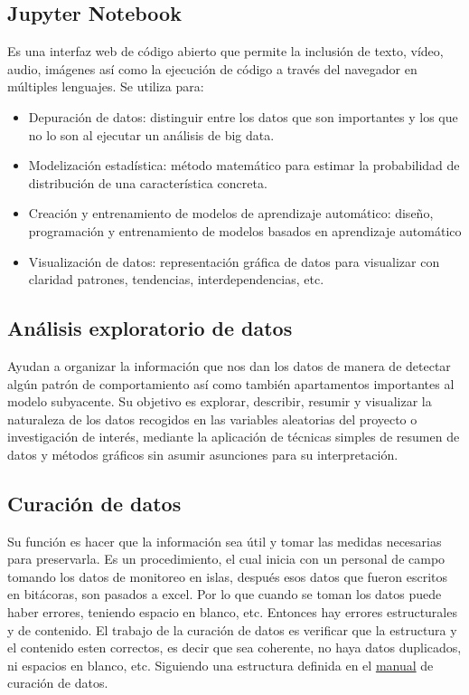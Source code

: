 \documentclass[12pt,letterpaper]{article}
\begin{document}
\subsection*{Jupyter Notebook}
Es una interfaz web de código abierto que permite la inclusión de texto, vídeo, audio, imágenes así
como la ejecución de código a través del navegador en múltiples lenguajes. 
\citep{cabrera_diaz_jupyter}
Se utiliza para: 
\begin{itemize}
\item Depuración de datos: distinguir entre los datos que son importantes y los que no lo son al
ejecutar un análisis de big data.
\item Modelización estadística: método matemático para estimar la probabilidad de distribución de
una característica concreta.
\item Creación y entrenamiento de modelos de aprendizaje automático: diseño, programación y
entrenamiento de modelos basados en aprendizaje automático
\item Visualización de datos: representación gráfica de datos para visualizar con claridad patrones,
tendencias, interdependencias, etc.
\citep{digital_guide_ionos_jupyter}
\end{itemize}

\subsection*{Análisis exploratorio de datos}
Ayudan a organizar la información que nos dan los datos de manera de detectar algún patrón de
comportamiento así como también apartamentos importantes al modelo subyacente.
\citep{orella_analisis_exploratorio}
Su objetivo es explorar, describir, resumir y visualizar la naturaleza de los datos recogidos en las
variables aleatorias del proyecto o investigación de interés, mediante la aplicación de técnicas
simples de resumen de datos y métodos gráficos sin asumir asunciones para su interpretación.
\citep{heix_bios_analisis_exploratorio}

\subsection*{Curación de datos}
Su función es hacer que la información sea útil y tomar las medidas necesarias para preservarla.
\citep{it_user_2020}
Es un procedimiento, el cual inicia con un personal de campo tomando los datos de monitoreo en
islas, después esos datos que fueron escritos en bitácoras, son pasados a excel. Por lo que cuando
se toman los datos puede haber errores, teniendo espacio en blanco, etc. Entonces  hay errores
estructurales y de contenido. El trabajo de la curación de datos es verificar que la estructura y el contenido esten correctos, es decir que sea coherente, no haya datos duplicados, ni
espacios en blanco, etc. Siguiendo una estructura definida en el \href{https://drive.google.com/drive/folders/1X-EdWtD6sxItwKmCyGpviCt85IvexRxo}{manual} de curación de datos.
\end{document}
